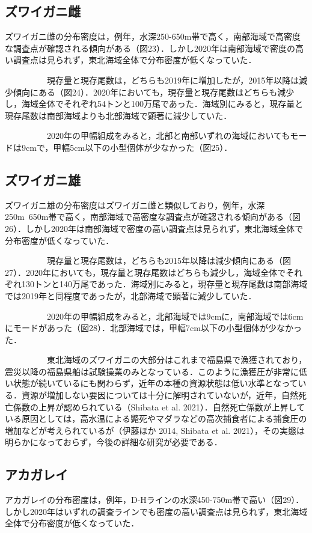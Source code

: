 \documentclass[11pt]{article} %
\begin{document}
\begin{linenumbers}
\subsection{ズワイガニ雌}
ズワイガニ雌の分布密度は，例年，水深250-650m帯で高く，南部海域で高密度な調査点が確認される傾向がある（図23）．しかし2020年は南部海域で密度の高い調査点は見られず，東北海域全体で分布密度が低くなっていた．

\ \ \ \ \ \ \ \ \ \ 
現存量と現存尾数は，どちらも2019年に増加したが，2015年以降は減少傾向にある（図24）．2020年においても，現存量と現存尾数はどちらも減少し，海域全体でそれぞれ54トンと100万尾であった．海域別にみると，現存量と現存尾数は南部海域よりも北部海域で顕著に減少していた．

\ \ \ \ \ \ \ \ \ \ 
2020年の甲幅組成をみると，北部と南部いずれの海域においてもモードは9cmで，甲幅5cm以下の小型個体が少なかった（図25）．


\subsection{ズワイガニ雄}
ズワイガニ雄の分布密度はズワイガニ雌と類似しており，例年，水深250m~650m帯で高く，南部海域で高密度な調査点が確認される傾向がある（図26）．しかし2020年は南部海域で密度の高い調査点は見られず，東北海域全体で分布密度が低くなっていた．

\ \ \ \ \ \ \ \ \ \ 
現存量と現存尾数は，どちらも2015年以降は減少傾向にある（図27）．2020年においても，現存量と現存尾数はどちらも減少し，海域全体でそれぞれ130トンと140万尾であった．海域別にみると，現存量と現存尾数は南部海域では2019年と同程度であったが，北部海域で顕著に減少していた．

\ \ \ \ \ \ \ \ \ \ 
2020年の甲幅組成をみると，北部海域では9cmに，南部海域では6cmにモードがあった（図28）．北部海域では，甲幅7cm以下の小型個体が少なかった．

\ \ \ \ \ \ \ \ \ \ 
東北海域のズワイガニの大部分はこれまで福島県で漁獲されており，震災以降の福島県船は試験操業のみとなっている．このように漁獲圧が非常に低い状態が続いているにも関わらず，近年の本種の資源状態は低い水準となっている．資源が増加しない要因については十分に解明されていないが，近年，自然死亡係数の上昇が認められている（Shibata et al. 2021）．自然死亡係数が上昇している原因としては，高水温による斃死やマダラなどの高次捕食者による捕食圧の増加などが考えられているが（伊藤ほか 2014, Shibata et al. 2021），その実態は明らかになっておらず，今後の詳細な研究が必要である．


\subsection{アカガレイ}
アカガレイの分布密度は，例年，D-Hラインの水深450-750m帯で高い（図29）．しかし2020年はいずれの調査ラインでも密度の高い調査点は見られず，東北海域全体で分布密度が低くなっていた．


\end{linenumbers}
\end{document}
